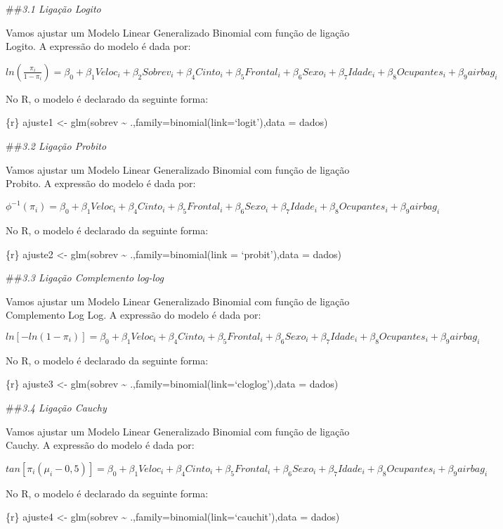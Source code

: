 \documentclass[]{article}
\begin{document}
\#\#\emph{3.1 Ligação Logito}

Vamos ajustar um Modelo Linear Generalizado Binomial com função de
ligação Logito. A expressão do modelo é dada por:

\(ln (\frac{\pi_i}{1-\pi_i}) = \beta_0 + \beta_1 Veloc_i + \beta_2 Sobrev_i+ \beta_4 Cinto_i + \beta_5 Frontal_i + \beta_6 Sexo_i + \beta_7 Idade_i + \beta_8 Ocupantes_i + \beta_9 airbag_i\)

No R, o modelo é declarado da seguinte forma:

\{r\} ajuste1 \textless{}- glm(sobrev \textasciitilde{}
.,family=binomial(link=`logit'),data = dados)

\#\#\emph{3.2 Ligação Probito}

Vamos ajustar um Modelo Linear Generalizado Binomial com função de
ligação Probito. A expressão do modelo é dada por:

\(\phi^{-1} (\pi_i) = \beta_0 + \beta_1 Veloc_i + \beta_4 Cinto_i + \beta_5 Frontal_i + \beta_6 Sexo_i + \beta_7 Idade_i + \beta_8 Ocupantes_i + \beta_9 airbag_i\)

No R, o modelo é declarado da seguinte forma:

\{r\} ajuste2 \textless{}- glm(sobrev \textasciitilde{}
.,family=binomial(link = `probit'),data = dados)

\#\#\emph{3.3 Ligação Complemento log-log}

Vamos ajustar um Modelo Linear Generalizado Binomial com função de
ligação Complemento Log Log. A expressão do modelo é dada por:

\(ln[-ln(1-\pi_i)] = \beta_0 + \beta_1 Veloc_i + \beta_4 Cinto_i + \beta_5 Frontal_i + \beta_6 Sexo_i + \beta_7 Idade_i + \beta_8 Ocupantes_i + \beta_9 airbag_i\)

No R, o modelo é declarado da seguinte forma:

\{r\} ajuste3 \textless{}- glm(sobrev \textasciitilde{}
.,family=binomial(link=`cloglog'),data = dados)

\#\#\emph{3.4 Ligação Cauchy}

Vamos ajustar um Modelo Linear Generalizado Binomial com função de
ligação Cauchy. A expressão do modelo é dada por:

\(tan[\pi_i(\mu_i- 0,5)] = \beta_0 + \beta_1 Veloc_i + \beta_4 Cinto_i + \beta_5 Frontal_i + \beta_6 Sexo_i + \beta_7 Idade_i + \beta_8 Ocupantes_i + \beta_9 airbag_i\)

No R, o modelo é declarado da seguinte forma:

\{r\} ajuste4 \textless{}- glm(sobrev \textasciitilde{}
.,family=binomial(link=`cauchit'),data = dados)
\end{document}

